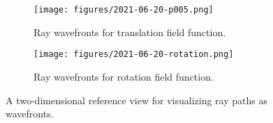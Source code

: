 \begin{figure}[!t]
\centering
\begin{subfigure}{0.48\linewidth}
    \texttt{[image: figures/2021-06-20-p005.png]}
    \caption{Ray wavefronts for translation field function.}
    \label{fig:reference-view-2d-translation}
\end{subfigure}
\begin{subfigure}{0.48\linewidth}
    \texttt{[image: figures/2021-06-20-rotation.png]}
    \caption{Ray wavefronts for rotation field function.}
    \label{fig:reference-view-2d-rotation}
\end{subfigure}
  \caption{A two-dimensional reference view for visualizing ray paths as wavefronts.}
  \label{fig:reference-view-2d}
\end{figure}

